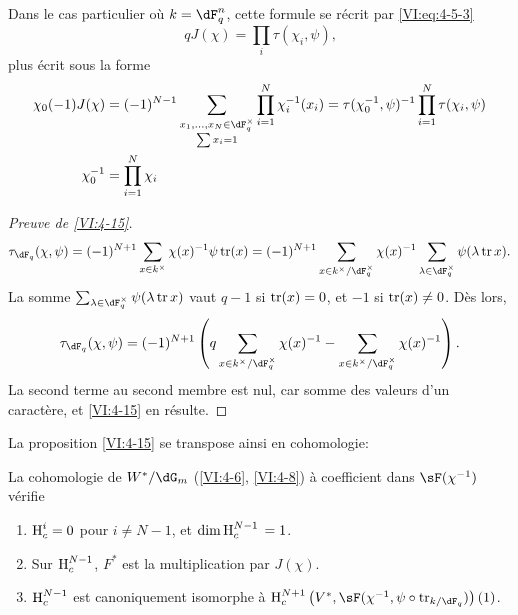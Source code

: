 Dans le cas particulier où $k=\dF_q^n$, cette formule se récrit par 
\eqref{VI:eq:4-5-3} 
\begin{equation*}\tag{4.15.1}\label{VI:eq:4-15-1}
  q J(\chi) = \prod_i \tau(\chi_i,\psi) \text{,} 
\end{equation*}
plus écrit sous la forme 
\begin{align*}
  \chi_0(-1) J(\chi) &= (-1)^{N-1} \sum_{\substack{x_1,\dots,x_N\in \dF_q^\times \\ \sum x_i = 1}} \prod_{i=1}^N \chi_i^{-1}(x_i) = \tau(\chi_0^{-1},\psi)^{-1} \prod_{i=1}^N \tau(\chi_i,\psi) \\
  \chi_0^{-1} &= \prod_{i=1}^N \chi_i 
\end{align*}





\begin{proof}[Preuve de \ref{VI:4-15}]
\[
  \tau_{\dF_q}(\chi,\psi) = (-1)^{N+1} \sum_{x\in k^\times} \chi(x)^{-1} \psi \tr(x) = (-1)^{N+1} \sum_{x\in k^\times/\dF_q^\times} \chi(x)^{-1} \sum_{\lambda\in \dF_q^\times} \psi(\lambda \tr x) \text{.}
\]
La somme $\sum_{\lambda\in \dF_q^\times} \psi(\lambda \tr x)$ vaut $q-1$ si 
$\operatorname{tr}(x)=0$, et $-1$ si $\operatorname{tr}(x)\ne 0$. Dès lors, 
\[
  \tau_{\dF_q}(\chi,\psi) = (-1)^{N+1} \left(q\sum_{x\in k^\times/\dF_q^\times} \chi(x)^{-1} - \sum_{x\in k^\times/\dF_q^\times} \chi(x)^{-1}\right) \text{.}
\]
La second terme au second membre est nul, car somme des valeurs d'un 
caractère, et \ref{VI:4-15} en résulte. 
\end{proof}

La proposition \ref{VI:4-15} se transpose ainsi en cohomologie: 





\begin{proposition_}\label{VI:4-16}
La cohomologie de $W^\ast/\dG_m$ (\ref{VI:4-6}, \ref{VI:4-8}) à coefficient 
dans $\sF(\chi^{-1})$ vérifie 
\begin{enumerate}[\indent (i)]
  \item $\operatorname{H}_c^i=0$ pour $i\ne N-1$, et $\dim \operatorname{H}_c^{N-1}{}=1$. 
  \item Sur $\operatorname{H}_c^{N-1}$, $F^\ast$ est la multiplication par $J(\chi)$. 
  \item $\operatorname{H}_c^{N-1}$ est canoniquement isomorphe à 
    $\h_c^{N+1}\left(V^\ast,\sF(\chi^{-1},\psi\circ \tr_{k/\dF_q})\right)(1)$. 
\end{enumerate}
\end{proposition_}

